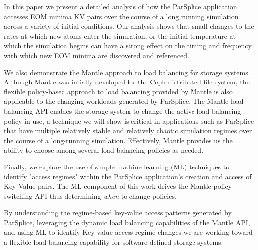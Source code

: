 In this paper we present a detailed analysis of how the ParSplice application
accesses EOM minima KV pairs over the course of a long running simulation
across a variety of initial conditions. Our analysis shows that small changes
to the rates at which new atoms enter the simulation, or the initial
temperature at which the simulation begins can have a strong effect on the
timing and frequency with which new EOM minima are discovered and referenced.

We also demonstrate the Mantle approach to load balancing for storage systems.
Although Mantle was intially developed for the Ceph distributed file system, the
flexible policy-based approach to load balancing provided by Mantle is also
applicable to the changing workloads generated by ParSplice. The Mantle
load-balancing API enables the storage system to change the active
load-balancing policy in use, a technique we will show is critical in
applications such as ParSplice that have multiple relatively stable and
relatively chaotic simulation regimes over the course of a long-running
simulation. Effectively, Mantle provides us the ability to choose among several
load-balancing policies as needed.

Finally, we explore the use of simple machine learning (ML) techniques to
identify "access regimes" within the ParSplice application's creation and
access of Key-Value pairs. The ML component of this work drives the Mantle
policy-switching API thus determining \emph{when} to change policies.

By understanding the regime-based key-value access patterns generated by
ParSplice, leveraging the dynamic load balancing capabilities of the Mantle
API, and using ML to identify Key-value access regime changes we are working
toward a flexible load balancing capability for software-defined storage
systems. 




